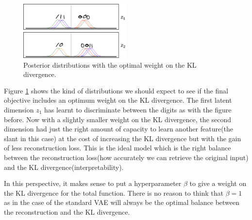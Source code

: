             \begin{figure}[H]
                \centering
                \includegraphics[width=0.5\textwidth]{imgs/1d_beta_size4.png}
                \caption{Posterior distributions with the optimal weight on the KL divergence.}
                \label{fig:1d_beta_size4}
            \end{figure}
            
            Figure \ref{fig:1d_beta_size4} shows the kind of distributions we should expect to see if the final objective includes an optimum weight on the KL divergence. The first latent dimension $z_1$ has learnt to discriminate between the digits as with the figure before. Now with a slightly smaller weight on the KL divergence, the second dimension had just the right amount of capacity to learn another feature(the slant in this case) at the cost of increasing the KL divergence but with the gain of less reconstruction loss. This is the ideal model which is the right balance between the reconstruction loss(how accurately we can retrieve the original input) and the KL divergence(interpretability).
            
            In this perspective, it makes sense to put a hyperparameter $\beta$ to give a weight on the KL divergence for the total function. There is no reason to think that $\beta=1$ as in the case of the standard VAE will always be the optimal balance between the reconstruction and the KL divergence.